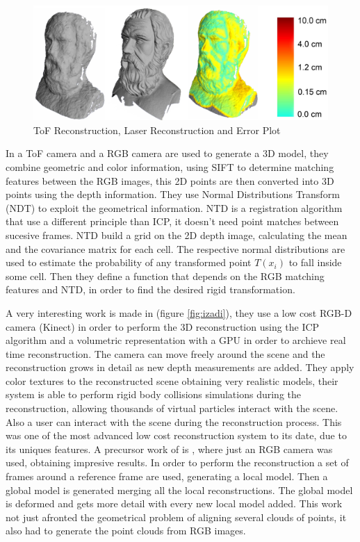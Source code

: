 \begin{figure}[h!]
\begin{center}
\includegraphics[scale=0.23]{images/cui}
\caption{ToF Reconstruction, Laser Reconstruction and Error Plot}
\label{fig:cui}
\end{center}
\end{figure}

In \cite{huhle} a ToF camera and a RGB camera are used to generate a 3D model, they combine geometric and color information, 
using SIFT to determine matching features between the RGB images, 
this 2D points are then converted into 3D points using the depth information. They use  Normal Distributions Transform (NDT) \cite{biber03} to exploit the geometrical 
information. NTD is a registration algorithm that use a different principle than ICP, it doesn't need point matches 
between sucesive frames. NTD build a grid on the 2D depth image, calculating the mean and the covariance matrix for each 
 cell. The respective normal distributions are used to estimate the probability of any transformed point $T(x_i)$ to fall 
inside some cell. Then they define a function that depends on the RGB matching features and NTD, in order to find the desired 
rigid transformation.

 
A very interesting work is made in \cite{izadi}(figure \ref{fig:izadi}), they use a low cost RGB-D camera (Kinect) in order to perform
the 3D reconstruction using the ICP algorithm  and a volumetric representation with a GPU in order to 
archieve real time reconstruction. The camera can move freely around the scene and the reconstruction grows in detail 
as new depth measurements are added. They apply color textures to the reconstructed scene obtaining very 
realistic models, their system is able to perform rigid body collisions 
simulations during the reconstruction, allowing thousands of virtual particles interact with the scene. Also a 
user can interact with the scene during the reconstruction process. This was one of the most advanced low cost 
reconstruction system to its date, due to its uniques features. A precursor work of \cite{izadi} is \cite{Newcombe10livedense}, where 
 just an RGB camera was used, obtaining impresive results. In order to perform the reconstruction a set of frames around 
a reference frame are used, generating a local model. Then a global model is generated merging all the local reconstructions.
The global model is deformed and gets more detail with every new local model added. This work not just afronted 
the geometrical problem of aligning several clouds of points, it also had to generate the point clouds from RGB images.

